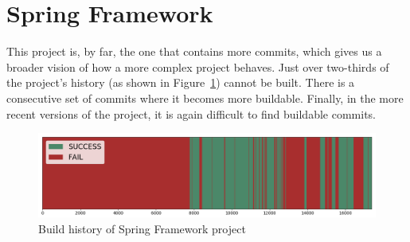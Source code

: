 \section{Spring Framework}

This project is, by far, the one that contains more commits, which gives us a broader vision of how a more complex project behaves.
Just over two-thirds of the project's history (as shown in Figure~\ref{fig:springHist}) cannot be built.
There is a consecutive set of commits where it becomes more buildable.
Finally, in the more recent versions of the project, it is again difficult to find buildable commits.

\begin{figure}[h]
	\begin{center}
		\includegraphics[width=\linewidth]{img/charts/spring-frameworkHist}
		\caption{Build history of Spring Framework project}
		\label{fig:springHist}
	\end{center}
\end{figure}

